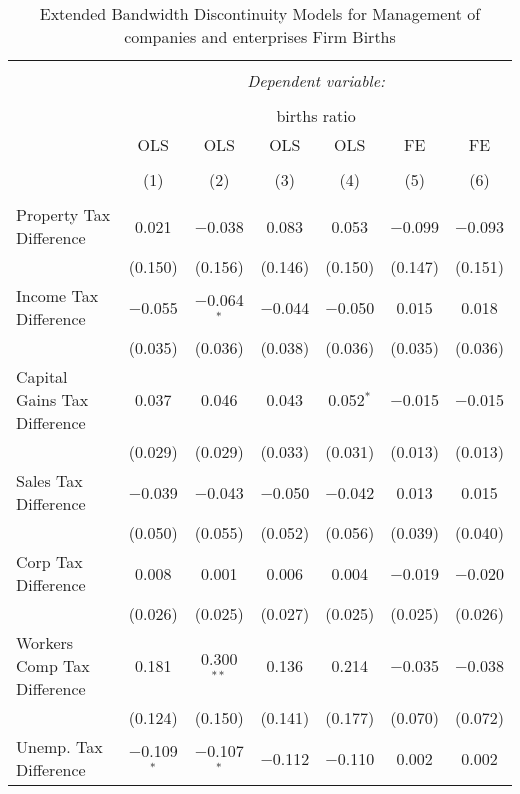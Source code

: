 
\begin{table}[!htbp] \centering 
  \caption{Extended Bandwidth Discontinuity Models for  Management of companies and enterprises Firm Births} 
  \label{55eb} 
\begin{tabular}{@{\extracolsep{5pt}}lcccccc} 
\\[-1.8ex]\hline 
\hline \\[-1.8ex] 
 & \multicolumn{6}{c}{\textit{Dependent variable:}} \\ 
\cline{2-7} 
\\[-1.8ex] & \multicolumn{6}{c}{births ratio} \\ 
 & OLS & OLS & OLS & OLS & FE & FE \\ 
\\[-1.8ex] & (1) & (2) & (3) & (4) & (5) & (6)\\ 
\hline \\[-1.8ex] 
 Property Tax Difference & 0.021 & $-$0.038 & 0.083 & 0.053 & $-$0.099 & $-$0.093 \\ 
  & (0.150) & (0.156) & (0.146) & (0.150) & (0.147) & (0.151) \\ 
  Income Tax Difference & $-$0.055 & $-$0.064$^{*}$ & $-$0.044 & $-$0.050 & 0.015 & 0.018 \\ 
  & (0.035) & (0.036) & (0.038) & (0.036) & (0.035) & (0.036) \\ 
  Capital Gains Tax Difference & 0.037 & 0.046 & 0.043 & 0.052$^{*}$ & $-$0.015 & $-$0.015 \\ 
  & (0.029) & (0.029) & (0.033) & (0.031) & (0.013) & (0.013) \\ 
  Sales Tax Difference & $-$0.039 & $-$0.043 & $-$0.050 & $-$0.042 & 0.013 & 0.015 \\ 
  & (0.050) & (0.055) & (0.052) & (0.056) & (0.039) & (0.040) \\ 
  Corp Tax Difference & 0.008 & 0.001 & 0.006 & 0.004 & $-$0.019 & $-$0.020 \\ 
  & (0.026) & (0.025) & (0.027) & (0.025) & (0.025) & (0.026) \\ 
  Workers Comp Tax Difference & 0.181 & 0.300$^{**}$ & 0.136 & 0.214 & $-$0.035 & $-$0.038 \\ 
  & (0.124) & (0.150) & (0.141) & (0.177) & (0.070) & (0.072) \\ 
  Unemp. Tax Difference & $-$0.109$^{*}$ & $-$0.107$^{*}$ & $-$0.112 & $-$0.110 & 0.002 & 0.002 \\ 

\end{tabular}
\end{table}
